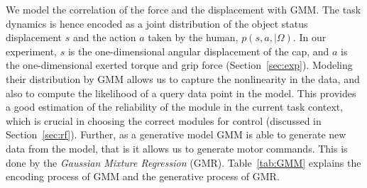 We model the correlation of the force and the displacement with
GMM. The task dynamics is hence encoded as a joint distribution of the
object status displacement $s$ and the action $a$ taken by the human,
$p(s,a,{\mid}{\Omega})$. In our experiment, $s$ is the one-dimensional
angular displacement of the cap, and $a$ is the one-dimensional
exerted torque and grip force (Section~\ref{sec:exp}).  Modeling their
distribution by GMM allows us to capture the nonlinearity in the data,
and also to compute the likelihood of a query data point in the
model. This provides a good estimation of the reliability of the
module in the current task context, which is crucial in choosing the
correct modules for control (discussed in
Section~\ref{sec:rf}). Further, as a generative model GMM is able to
generate new data from the model, that is it allows us to generate
motor commands. This is done by the {\em Gaussian Mixture Regression}
(GMR). Table~\ref{tab:GMM} explains the encoding process of GMM and
the generative process of GMR.  %


